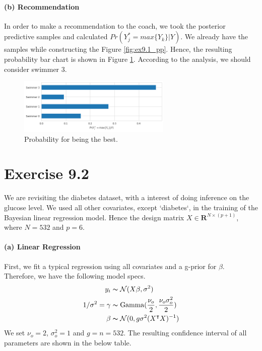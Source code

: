 \documentclass[11pt, letterpaper]{article}
\begin{document}
\paragraph{(b) Recommendation}
In order to make a recommendation to the coach, we took the posterior predictive samples and calculated $Pr(Y_j^* = max\{Y_k\}|Y)$. We already have the samples while constructing the Figure \ref{fig:ex9.1_pp}. Hence, the resulting probability bar chart is shown in Figure \ref{fig:ex9.1_pp_pr_max}. According to the analysis, we should consider swimmer 3.
\begin{figure}[!h]
  \centering
  \includegraphics[width=0.65\textwidth]{1.4.png}
  \captionsetup{justification=centering}
  \caption{Probability for being the best.}
  \label{fig:ex9.1_pp_pr_max}
\end{figure}


\newpage
\section{Exercise 9.2}
We are revisiting the diabetes dataset, with a interest of doing inference on the glucose level. We used all other covariates, except `diabetes`, in the training of the Bayesian linear regression model. Hence the design matrix $X \in \mathbf{R}^{N\times (p+1)}$, where $N = 532$ and $p = 6$.

\paragraph{(a) Linear Regression}
First, we fit a typical regression using all covariates and a g-prior for $\beta$. Therefore, we have the following model specs.
\begin{align*}
    y_i &\thicksim \mathcal{N}(X\beta, \sigma^2) \\
    1/\sigma^2 = \gamma &\thicksim \text{Gamma}(\frac{\nu_o}{2}, \frac{\nu_o\sigma_o^2}{2}) \\
    \beta &\thicksim \mathcal{N}(0, g\sigma^2(X^{\intercal}X)^{-1})
\end{align*}
We set $\nu_o = 2$, $\sigma^2_o = 1$ and $g = n = 532$. The resulting confidence interval of all parameters are shown in the below table.
\end{document}

